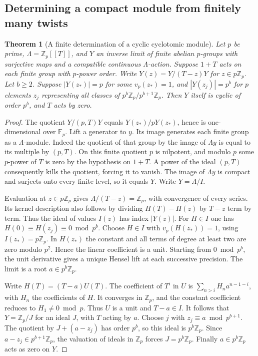\documentclass[a4paper,11pt]{article}
\newtheorem{theorem}[proposition]{Theorem}
\theoremstyle{definition}
\theoremstyle{remark}
\newcommand{\ZZ}{\mathbb Z}\newcommand{\ord}{\operatorname{ord}}
\numberwithin{equation}{section}
\begin{document}
\subsection{Determining a compact module from finitely many twists}\label{nav:IV-46}
\begin{theorem}[A finite determination of a cyclic cyclotomic module]\leavevmode
\label{thm:specializations280}
Let \(p\) be prime, \(\Lambda=\ZZ_p[[T]]\), and \(Y\) an inverse
limit of finite abelian \(p\)-groups with surjective maps and a
compatible continuous \(\Lambda\)-action. Suppose \(1+T\) acts
on each finite group with \(p\)-power order. Write
\(Y(z)=Y/(T-z)Y\) for \(z\in p\ZZ_p\). Let \(b\ge2\).
Suppose \(|Y(z_*)|=p\) for some \(v_p(z_*)=1\), and
\(|Y(z_j)|=p^b\) for \(p\) elements \(z_j\) representing all
classes of \(p^b\ZZ_p/p^{b+1}\ZZ_p\). Then \(Y\) itself is
cyclic of order \(p^b\), and \(T\) acts by zero.
\end{theorem}
\begin{proof}
The quotient \(Y/(p,T)Y\) equals \(Y(z_*)/pY(z_*)\), hence is
one-dimensional over \(\mathbb F_p\). Lift a generator to \(y\).
Its image generates each finite group as a \(\Lambda\)-module.
Indeed the quotient of that group by the image of
\(\Lambda y\) is equal to its multiple by \((p,T)\).
On this finite quotient \(p\) is nilpotent, and modulo \(p\)
some \(p\)-power of \(T\) is zero by the hypothesis on
\(1+T\). A power of the ideal \((p,T)\) consequently kills
the quotient, forcing it to vanish. The image of \(\Lambda y\)
is compact and surjects onto every finite level, so it equals
\(Y\). Write \(Y=\Lambda/I\).

Evaluation at \(z\in p\ZZ_p\) gives
\(\Lambda/(T-z)=\ZZ_p\), with convergence of every series.
Its kernel description also follows by dividing \(H(T)-H(z)\)
by \(T-z\) term by term. Thus the ideal of values \(I(z)\)
has index \(|Y(z)|\). For \(H\in I\) one has
\(H(0)\equiv H(z_j)\equiv0\bmod p^b\). Choose \(H\in I\)
with \(v_p(H(z_*))=1\), using \(I(z_*)=p\ZZ_p\).
In \(H(z_*)\) the constant and all terms of degree at least
two are zero modulo \(p^2\). Hence the linear coefficient is
a unit. Starting from \(0\bmod p^b\), the unit derivative
gives a unique Hensel lift at each successive precision.
The limit is a root \(a\in p^b\ZZ_p\).

Write \(H(T)=(T-a)U(T)\). The coefficient of \(T^i\) in
\(U\) is \(\sum_{n>i}H_n a^{n-1-i}\), with \(H_n\) the
coefficients of \(H\). It converges in \(\ZZ_p\), and the
constant coefficient reduces to \(H_1\ne0\bmod p\).
Thus \(U\) is a unit and \(T-a\in I\). It follows that
\(Y=\ZZ_p/J\) for an ideal \(J\), with \(T\) acting by \(a\).
Choose \(j\) with \(z_j\equiv a\bmod p^{b+1}\). The quotient
by \(J+(a-z_j)\) has order \(p^b\), so this ideal is
\(p^b\ZZ_p\). Since \(a-z_j\in p^{b+1}\ZZ_p\), the valuation
of ideals in \(\ZZ_p\) forces \(J=p^b\ZZ_p\). Finally
\(a\in p^b\ZZ_p\) acts as zero on \(Y\).
\end{proof}
\end{document}

